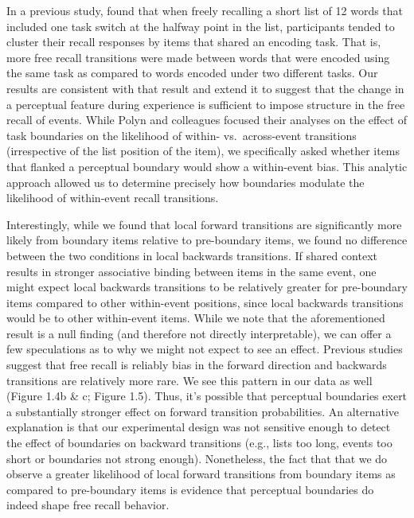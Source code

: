 In a previous study, \autocite{polyn_context_2009} found that when
freely recalling a short list of 12 words that included one task switch
at the halfway point in the list, participants tended to cluster their
recall responses by items that shared an encoding task. That is, more
free recall transitions were made between words that were encoded using
the same task as compared to words encoded under two different tasks.
Our results are consistent with that result and extend it to suggest
that the change in a perceptual feature during experience is sufficient
to impose structure in the free recall of events. While Polyn and
colleagues focused their analyses on the effect of task boundaries on
the likelihood of within- vs.~across-event transitions (irrespective of
the list position of the item), we specifically asked whether items that
flanked a perceptual boundary would show a within-event bias. This
analytic approach allowed us to determine precisely how boundaries
modulate the likelihood of within-event recall transitions.

Interestingly, while we found that local forward transitions are
significantly more likely from boundary items relative to pre-boundary
items, we found no difference between the two conditions in local
backwards transitions. If shared context results in stronger associative
binding between items in the same event, one might expect local
backwards transitions to be relatively greater for pre-boundary items
compared to other within-event positions, since local backwards
transitions would be to other within-event items. While we note that the
aforementioned result is a null finding (and therefore not directly
interpretable), we can offer a few speculations as to why we might not
expect to see an effect. Previous studies suggest that free recall is
reliably bias in the forward direction
\autocites{kahana_associative_1996}{howard_distributed_2002} and
backwards transitions are relatively more rare. We see this pattern in
our data as well (Figure 1.4b \& c; Figure 1.5). Thus, it's possible
that perceptual boundaries exert a substantially stronger effect on
forward transition probabilities. An alternative explanation is that our
experimental design was not sensitive enough to detect the effect of
boundaries on backward transitions (e.g., lists too long, events too
short or boundaries not strong enough). Nonetheless, the fact that that
we do observe a greater likelihood of local forward transitions from
boundary items as compared to pre-boundary items is evidence that
perceptual boundaries do indeed shape free recall behavior.

